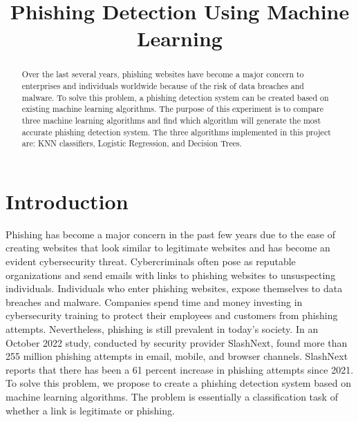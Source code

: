 \documentclass[conference]{IEEEtran}
\begin{document}
\title{Phishing Detection Using Machine Learning}

\author{
\and
{}
\and
{}
}

\maketitle


\begin{abstract}
Over the last several years, phishing websites have become a major concern to enterprises and individuals worldwide because of the risk of data breaches and malware. To solve this problem, a phishing detection system can be created based on existing machine learning algorithms. The purpose of this experiment is to compare three machine learning algorithms and find which algorithm will generate the most accurate phishing detection system. The three algorithms implemented in this project are: KNN classifiers, Logistic Regression, and Decision Trees. 

\end{abstract}

\section{Introduction}
Phishing has become a major concern in the past few years due to the ease of creating websites that look similar to legitimate websites and has become an evident cybersecurity threat. Cybercriminals often pose as reputable organizations and send emails with links to phishing websites to unsuspecting individuals. Individuals who enter phishing websites, expose themselves to data breaches and malware. Companies spend time and money investing in cybersecurity training to protect their employees and customers from phishing attempts. Nevertheless, phishing is still prevalent in today’s society. In an October 2022 study, conducted by security provider SlashNext, found more than 255 million phishing attempts in email, mobile, and browser channels. SlashNext reports that there has been a 61 percent increase in phishing attempts since 2021. To solve this problem, we propose to create a phishing detection system based on machine learning algorithms. The problem is essentially a classification task of whether a link is legitimate or phishing.  
\end{document}
